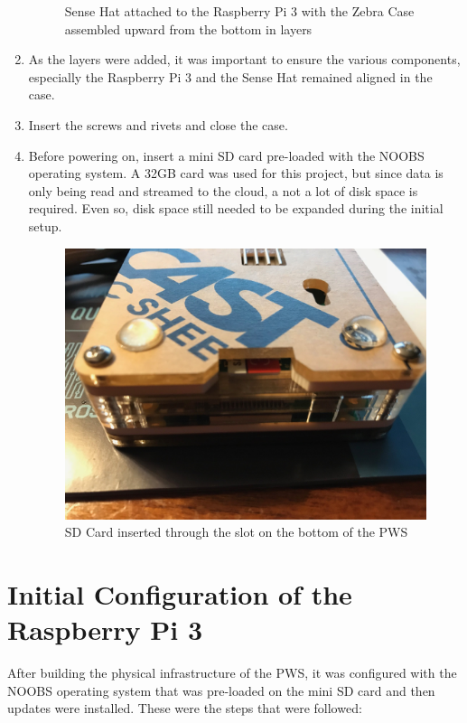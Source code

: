 \documentclass[sigconf]{acmart}
\begin{document}
\begin{enumerate}
\begin{figure}[H]
    \caption{Sense Hat attached to the Raspberry Pi 3 with the Zebra Case assembled upward from the bottom in layers}
\end{figure}
\item As the layers were added, it was important to ensure the various components, especially the Raspberry Pi 3 and the Sense Hat remained aligned in the case.
\item Insert the screws and rivets and close the case.
\item Before powering on, insert a mini SD card pre-loaded with the NOOBS operating system. A 32GB card was used for this project, but since data is only being read and streamed to the cloud, a not a lot of disk space is required. Even so, disk space still needed to be expanded during the initial setup.
\begin{figure}[H]
    \centering
    \includegraphics[scale=.10]{Bottom_Case.jpg}
    \caption{SD Card inserted through the slot on the bottom of the PWS}
\end{figure}
\end{enumerate}

\section{Initial Configuration of the Raspberry Pi 3}

After building the physical infrastructure of the PWS, it was configured with the NOOBS operating system that was pre-loaded on the mini SD card and then updates were installed. These were the steps that were followed:
\end{document}
